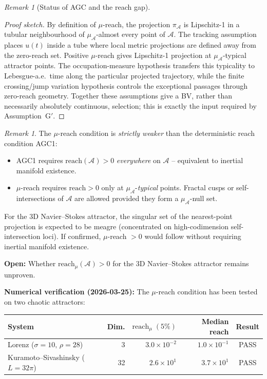 \documentclass[12pt,a4paper]{article}
\theoremstyle{definition}
\theoremstyle{plain}
\theoremstyle{remark}
\newtheorem{remark}[definition]{Remark}
\begin{document}
\begin{remark}[Status of AGC and the reach gap]
\begin{proof}[Proof sketch]
By definition of $\mu$-reach, the projection $\pi_{\mathcal{A}}$ is
Lipschitz-1 in a tubular neighbourhood of $\mu_{\mathcal{A}}$-almost
every point of $\mathcal{A}$.
The tracking assumption places $u(t)$ inside a tube where local metric
projections are defined away from the zero-reach set.  Positive
$\mu$-reach gives Lipschitz-1 projection at $\mu_{\mathcal{A}}$-typical
attractor points.  The occupation-measure hypothesis transfers this
typicality to Lebesgue-a.e.\ time along the particular projected
trajectory, while the finite crossing/jump variation hypothesis controls
the exceptional passages through zero-reach geometry.  Together these
assumptions give a BV, rather than necessarily absolutely continuous,
selection; this is exactly the input required by Assumption~G$'$.
\end{proof}

\begin{remark}\label{rem:mu-reach-advantage}
The $\mu$-reach condition is \emph{strictly weaker} than the deterministic
reach condition AGC1:
\begin{itemize}
\item AGC1 requires $\mathrm{reach}(\mathcal{A}) > 0$ \emph{everywhere}
  on $\mathcal{A}$ -- equivalent to inertial manifold existence.
\item $\mu$-reach requires $\mathrm{reach} > 0$ only at
  $\mu_{\mathcal{A}}$-\emph{typical} points.
  Fractal cusps or self-intersections of $\mathcal{A}$ are allowed
  provided they form a $\mu_{\mathcal{A}}$-null set.
\end{itemize}
For the 3D Navier--Stokes attractor, the singular set of the
nearest-point projection is expected to be meagre
(concentrated on high-codimension self-intersection loci).
If confirmed, $\mu$-reach $> 0$ would follow without
requiring inertial manifold existence.

\textbf{Open:} Whether $\mathrm{reach}_\mu(\mathcal{A}) > 0$ for the
3D Navier--Stokes attractor remains unproven.

\textbf{Numerical verification (2026-03-25):}
The $\mu$-reach condition has been tested on two chaotic attractors:

\begin{center}
\small
\begin{tabular}{l|r|r|r|c}
\textbf{System} & \textbf{Dim.} & $\mathrm{reach}_\mu\;(5\%)$ & \textbf{Median reach} & \textbf{Result} \\
\hline
Lorenz ($\sigma{=}10,\,\rho{=}28$) & 3 & $3.0 \times 10^{-2}$ & $1.0 \times 10^{-1}$ & PASS \\
Kuramoto--Sivashinsky ($L{=}32\pi$) & 32 & $2.6 \times 10^{1}$ & $3.7 \times 10^{1}$ & PASS
\end{tabular}
\end{center}


\end{remark}
\end{remark}
\end{document}
